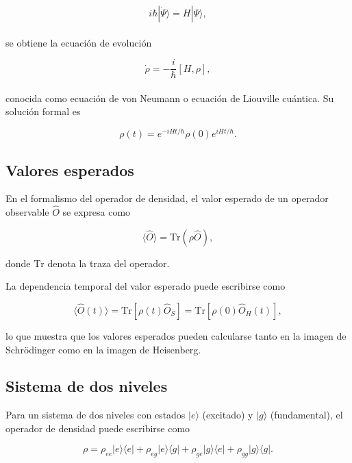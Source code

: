 \documentclass[11pt]{report}
\begin{document}
\begin{equation}
i\hbar |\dot{\Psi}\rangle = H|\Psi\rangle,
\end{equation}
\\
se obtiene la ecuación de evolución

\begin{equation}
\dot{\rho} = -\frac{i}{\hbar}[H,\rho],
\end{equation}
\\
conocida como ecuación de von Neumann o ecuación de Liouville cuántica. Su solución formal es

\begin{equation}
\rho(t) =
e^{-iHt/\hbar}\rho(0)e^{iHt/\hbar}.
\end{equation}

\subsection{Valores esperados}

En el formalismo del operador de densidad, el valor esperado de un operador observable $\hat{O}$ se expresa como

\begin{equation}
\langle \hat{O} \rangle =
\mathrm{Tr}(\rho \hat{O}),
\end{equation}

donde $\mathrm{Tr}$ denota la traza del operador.

La dependencia temporal del valor esperado puede escribirse como

\begin{equation}
\langle \hat{O}(t) \rangle
=
\mathrm{Tr}[\rho(t)\hat{O}_S]
=
\mathrm{Tr}[\rho(0)\hat{O}_H(t)],
\end{equation}

lo que muestra que los valores esperados pueden calcularse tanto en la imagen de Schrödinger como en la imagen de Heisenberg.

\subsection{Sistema de dos niveles}

Para un sistema de dos niveles con estados $|e\rangle$ (excitado) y $|g\rangle$ (fundamental), el operador de densidad puede escribirse como

\begin{equation}
\rho =
\rho_{ee}|e\rangle\langle e|
+
\rho_{eg}|e\rangle\langle g|
+
\rho_{ge}|g\rangle\langle e|
+
\rho_{gg}|g\rangle\langle g|.
\end{equation}
\end{document}

